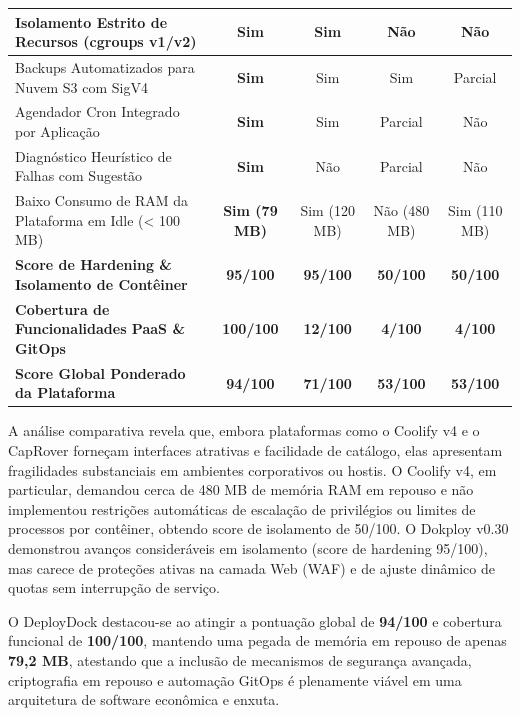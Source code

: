 \begin{quadro}[htb]
\begin{minipage}{\textwidth}
\begin{tabular}{|p{6.5cm}|c|c|c|c|}
            \hline
            Isolamento Estrito de Recursos (cgroups v1/v2) & \textbf{Sim} & Sim & Não & Não \\
            \hline
            Backups Automatizados para Nuvem S3 com SigV4 & \textbf{Sim} & Sim & Sim & Parcial \\
            \hline
            Agendador Cron Integrado por Aplicação & \textbf{Sim} & Sim & Parcial & Não \\
            \hline
            Diagnóstico Heurístico de Falhas com Sugestão & \textbf{Sim} & Não & Parcial & Não \\
            \hline
            Baixo Consumo de RAM da Plataforma em Idle (< 100 MB) & \textbf{Sim (79 MB)} & Sim (120 MB) & Não (480 MB) & Sim (110 MB) \\
            \hline
            \hline
            \textbf{Score de Hardening \& Isolamento de Contêiner} & \textbf{95/100} & \textbf{95/100} & \textbf{50/100} & \textbf{50/100} \\
            \hline
            \textbf{Cobertura de Funcionalidades PaaS \& GitOps} & \textbf{100/100} & \textbf{12/100} & \textbf{4/100} & \textbf{4/100} \\
            \hline
            \textbf{Score Global Ponderado da Plataforma} & \textbf{94/100} & \textbf{71/100} & \textbf{53/100} & \textbf{53/100} \\
            \hline
        \end{tabular}
    \end{minipage}
\end{quadro}

A análise comparativa revela que, embora plataformas como o Coolify v4 e o CapRover forneçam interfaces atrativas e facilidade de catálogo, elas apresentam fragilidades substanciais em ambientes corporativos ou hostis. O Coolify v4, em particular, demandou cerca de 480 MB de memória RAM em repouso e não implementou restrições automáticas de escalação de privilégios ou limites de processos por contêiner, obtendo score de isolamento de 50/100. O Dokploy v0.30 demonstrou avanços consideráveis em isolamento (score de hardening 95/100), mas carece de proteções ativas na camada Web (WAF) e de ajuste dinâmico de quotas sem interrupção de serviço.

O DeployDock destacou-se ao atingir a pontuação global de \textbf{94/100} e cobertura funcional de \textbf{100/100}, mantendo uma pegada de memória em repouso de apenas \textbf{79,2 MB}, atestando que a inclusão de mecanismos de segurança avançada, criptografia em repouso e automação GitOps é plenamente viável em uma arquitetura de software econômica e enxuta.
